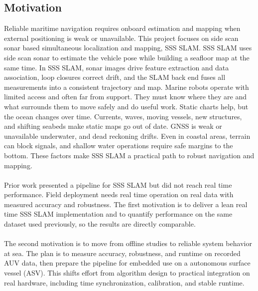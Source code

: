 \subsection{Motivation}
Reliable maritime navigation requires onboard estimation and mapping when external positioning is weak or unavailable. This project focuses on side scan sonar based simultaneous localization and mapping, SSS SLAM. SSS SLAM uses side scan sonar to estimate the vehicle pose while building a seafloor map at the same time. In SSS SLAM, sonar images drive feature extraction and data association, loop closures correct drift, and the SLAM back end fuses all measurements into a consistent trajectory and map. Marine robots operate with limited access and often far from support. They must know where they are and what surrounds them to move safely and do useful work. Static charts help, but the ocean changes over time. Currents, waves, moving vessels, new structures, and shifting seabeds make static maps go out of date. GNSS is weak or unavailable underwater, and dead reckoning drifts. Even in coastal areas, terrain can block signals, and shallow water operations require safe margins to the bottom. These factors make SSS SLAM a practical path to robust navigation and mapping.
\\ \\
Prior work \cite{side_scan_sonar_master_thesis} presented a pipeline for SSS SLAM but did not reach real time performance. Field deployment needs real time operation on real data with measured accuracy and robustness. The first motivation is to deliver a lean real time SSS SLAM implementation and to quantify performance on the same dataset used previously, so the results are directly comparable.
\\ \\
The second motivation is to move from offline studies to reliable system behavior at sea. The plan is to measure accuracy, robustness, and runtime on recorded AUV data, then prepare the pipeline for embedded use on a autonomous surface vessel (ASV). This shifts effort from algorithm design to practical integration on real hardware, including time synchronization, calibration, and stable runtime.


